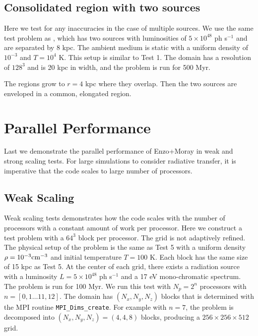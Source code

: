 \documentclass[12pt,preprint]{aastex}
\begin{document}
\subsection{Consolidated  region with two sources}

Here we test for any inaccuracies in the case of multiple sources.  We
use the same test problem as \citet[][\S5.1.2]{Petkova09}, which has
two sources with luminosities of $5 \times 10^{48}$ ph s$^{-1}$ and
are separated by 8 kpc.  The ambient medium is static with a uniform
density of $10^{-3}$ \cubecm and $T = 10^4$ K.  This setup is similar
to Test 1.  The domain has a resolution of $128^3$ and is 20 kpc in
width, and the problem is run for 500 Myr.  

The  regions grow to $r = 4$ kpc where they overlap.  Then
the two sources are enveloped in a common, elongated 
region.

\section{Parallel Performance}

Last we demonstrate the parallel performance of Enzo+Moray in weak and
strong scaling tests.  For large simulations to consider radiative
transfer, it is imperative that the code scales to large number of
processors.

\subsection{Weak Scaling}
\label{sec:weak_sc}

Weak scaling tests demonstrates how the code scales with the number of
processors with a constant amount of work per processor.  Here we
construct a test problem with a $64^3$ block per processor.  The grid
is not adaptively refined.  The physical setup of the problem is the
same as Test 5 with a uniform density $\rho = 10^{-3} \cubecm$ and
initial temperature $T = 100$ K.  Each block has the same size of 15
kpc as Test 5.  At the center of each grid, there exists a radiation
source with a luminosity $L = 5 \times 10^{48}$ ph s$^{-1}$ and a 17
eV mono-chromatic spectrum.  The problem is run for 100 Myr.  We run
this test with $N_p = 2^n$ processors with $n = [0,1 \dots 11,12]$.
The domain has $(N_x, N_y, N_z)$ blocks that is determined with the
MPI routine \texttt{MPI\_Dims\_create}.  For example with $n = 7$, the
problem is decomposed into $(N_x, N_y, N_z) = (4,4,8)$ blocks,
producing a $256 \times 256 \times 512$ grid.
\end{document}
